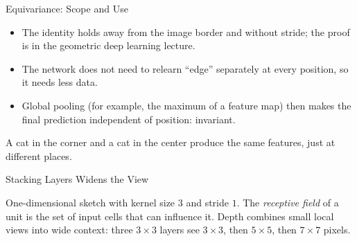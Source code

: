 \documentclass{ntuabeamer}
\begin{document}
\begin{frame}{Equivariance: Scope and Use}
  \begin{itemize}
    \item The identity holds away from the image border and without stride; the proof is in the geometric deep learning lecture.
    \item The network does not need to relearn ``edge'' separately at every position, so it needs less data.
    \item Global pooling (for example, the maximum of a feature map) then makes the final prediction independent of position: invariant.
  \end{itemize}
  A cat in the corner and a cat in the center produce the same features, just at different places.
\end{frame}


\begin{frame}{Stacking Layers Widens the View}
  \centering

  One-dimensional sketch with kernel size $3$ and stride $1$.
  The \emph{receptive field} of a unit is the set of input cells that can influence it.
  Depth combines small local views into wide context: three $3\times3$ layers see $3\times3$, then $5\times5$, then $7\times7$ pixels.
\end{frame}
\end{document}
